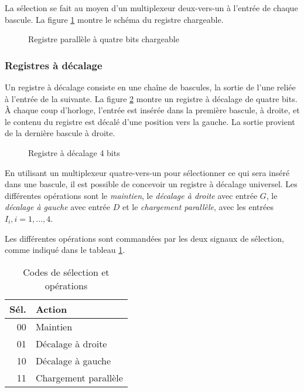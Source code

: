 \documentclass[11pt]{article}
\begin{document}
La sélection se fait au moyen d'un multiplexeur deux-vers-un à
l'entrée de chaque bascule. La figure \ref{fig:orgb7bdead} montre le schéma
du registre chargeable.

\begin{figure}[htbp]
\centering

\caption{\label{fig:orgb7bdead}Registre parallèle à quatre bits chargeable}
\end{figure}

\subsubsection{Registres à décalage}
\label{sec:org3de46e1}

Un registre à décalage consiste en une chaîne de bascules, la sortie
de l'une reliée à l'entrée de la suivante. La figure \ref{fig:orgda7033e} montre
un registre à décalage de quatre bits. À chaque coup d'horloge,
l'entrée est insérée dans la première bascule, à droite, et le contenu
du registre est décalé d'une position vers la gauche. La sortie
provient de la dernière bascule à droite.

\begin{figure}[htbp]
\centering

\caption{\label{fig:orgda7033e}Registre à décalage 4 bits}
\end{figure}

En utilisant un multiplexeur quatre-vers-un pour sélectionner ce qui
sera inséré dans une bascule, il est possible de concevoir un registre
à décalage universel. Les différentes opérations sont le \emph{maintien}, le
\emph{décalage à droite} avec entrée \(G\), le \emph{décalage à gauche} avec entrée
\(D\) et le \emph{chargement parallèle}, avec les entrées \(I_i, i=1, \ldots,
4\).

Les différentes opérations sont commandées par les deux signaux de
sélection, comme indiqué dans le tableau \ref{tab:org785fdaa}.

\begin{table}[htbp]
\caption{\label{tab:org785fdaa}Codes de sélection et opérations}
\centering
\begin{tabular}{rl}
Sél. & Action\\[0pt]
\hline
00 & Maintien\\[0pt]
01 & Décalage à droite\\[0pt]
10 & Décalage à gauche\\[0pt]
11 & Chargement parallèle\\[0pt]
\end{tabular}
\end{table}
\end{document}
